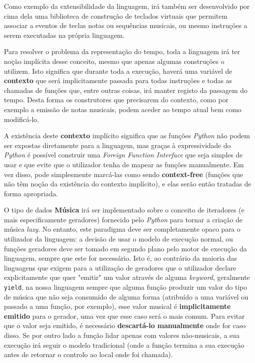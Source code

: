 Como exemplo da extensibilidade da linguagem, irá também ser desenvolvido por cima dela uma biblioteca de construção de teclados virtuais que permitem associar a eventos de teclas notas ou sequências musicais, ou mesmo instruções a serem executadas na própria linguagem.

Para resolver o problema da representação do tempo, toda a linguagem irá ter noção implícita desse conceito, mesmo que apenas algumas construções o utilizem. Isto significa que durante toda a execução, haverá uma variável de \textbf{contexto} que será implicitamente passada para todas instruções e todas as chamadas de funções que, entre outras coisas, irá manter registo da passagem do tempo. Desta forma os construtores que precisarem do contexto, como por exemplo a emissão de notas musicais, podem aceder ao tempo atual bem como modificá-lo.

A existência deste \textbf{contexto} implícito significa que as funções \textit{Python} não podem ser expostas diretamente para a linguagem, mas graças à expressividade do \textit{Python} é possível construir uma \textit{Foreign Function Interface} que seja simples de usar e que evite que o utilizador tenha de mapear as funções manualmente. Em vez disso, pode simplesmente marcá-las como sendo \textbf{context-free} (funções que não têm noção da existência do contexto implícito), e elas serão então tratadas de forma apropriada.

O tipo de dados \textbf{Música} irá ser implementado sobre o conceito de iteradores (e mais especificamente geradores) fornecido pelo \textit{Python} para tornar a criação de música \textit{lazy}. No entanto, este paradigma deve ser completamente opaco para o utilizador da linguagem: a decisão de usar o modelo de execução normal, ou funções geradores deve ser tomado em segundo plano pelo motor de execução da linguagem, sempre que este for necessário. Isto é, ao contrário da maioria das linguagens que exigem para a utilização de geradores que o utilizador declare explicitamente que quer "emitir" um valor através de alguma \textit{keyword}, geralmente \texttt{yield}, na nossa linguagem sempre que alguma função produzir um valor do tipo de música que não seja consumido de alguma forma (atribuído a uma variável ou passado a uma função, por exemplo), esse valor musical é \textbf{implicitamente emitido} para o gerador, uma vez que esse caso será o mais comum. Para evitar que o valor seja emitido, é necessário \textbf{descartá-lo manualmente} onde for caso disso. Se por outro lado a função lidar apenas com valores não-musicais, a sua execução irá seguir o modelo tradicional (onde a função termina a sua execução antes de retornar o controlo ao local onde foi chamada).
\newpage
